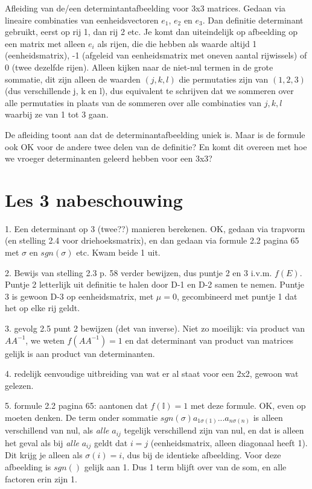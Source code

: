 \documentclass{article}
\begin{document}
Afleiding van de/een determintantafbeelding voor 3x3 matrices. Gedaan via lineaire combinaties van eenheidsvectoren $e_1$, $e_2$ en $e_3$. Dan definitie determinant gebruikt, eerst op rij 1, dan rij 2 etc. Je komt dan uiteindelijk op afbeelding op een matrix met alleen $e_i$ als rijen, die die hebben als waarde altijd 1 (eenheidsmatrix), -1 (afgeleid van eenheidsmatrix met oneven aantal rijwissels) of 0 (twee dezelfde rijen). Alleen kijken naar de niet-nul termen in de grote sommatie, dit zijn alleen de waarden $(j,k,l)$ die permutaties zijn van $(1,2,3)$ (dus verschillende j, k en l), dus equivalent te schrijven dat we sommeren over alle permutaties in plaats van de sommeren over alle combinaties van $j,k,l$ waarbij ze van 1 tot 3 gaan. 

De afleiding toont aan dat de determinantafbeelding uniek is. Maar is de formule ook OK voor de andere twee delen van de definitie?  En komt dit overeen met hoe we vroeger determinanten geleerd hebben voor een 3x3? 


\section{Les 3 nabeschouwing}

1. Een determinant op 3 (twee??) manieren berekenen. OK, gedaan via trapvorm (en stelling 2.4 voor driehoeksmatrix), en dan gedaan via formule 2.2 pagina 65 met $\sigma$ en $sgn(\sigma)$ etc. Kwam beide 1 uit. 

2. Bewijs van stelling 2.3 p. 58 verder bewijzen, dus puntje 2 en 3 i.v.m. $f(E)$. Puntje 2 letterlijk uit definitie te halen door D-1 en D-2 samen te nemen. Puntje 3 is gewoon D-3 op eenheidsmatrix, met $\mu=0$, gecombineerd met puntje 1 dat het op elke rij geldt.  

3. gevolg 2.5 punt 2 bewijzen (det van inverse). Niet zo moeilijk: via product van $AA^{-1}$, we weten $f( AA^{-1}) = 1$ en dat determinant van product van matrices gelijk is aan product van determinanten. 

4. redelijk eenvoudige uitbreiding van wat er al staat voor een 2x2, gewoon wat gelezen. 

5. formule 2.2 pagina 65: aantonen dat $f(\mathbb{I})=1$ met deze formule. OK, even op moeten denken. De term onder sommatie $sgn(\sigma)a_{1\sigma(1)}...a_{n\sigma(n)}$ is alleen verschillend van nul, als \emph{alle} $a_{ij}$ tegelijk verschillend zijn van nul, en dat is alleen het geval als bij \emph{alle} $a_{ij}$ geldt dat $i=j$ (eenheidsmatrix, alleen diagonaal heeft 1). Dit krijg je alleen als $\sigma(i)=i$, dus bij de identieke afbeelding. Voor deze afbeelding is $sgn()$ gelijk aan 1. Dus 1 term blijft over van de som, en alle factoren erin zijn 1. 
\end{document}
